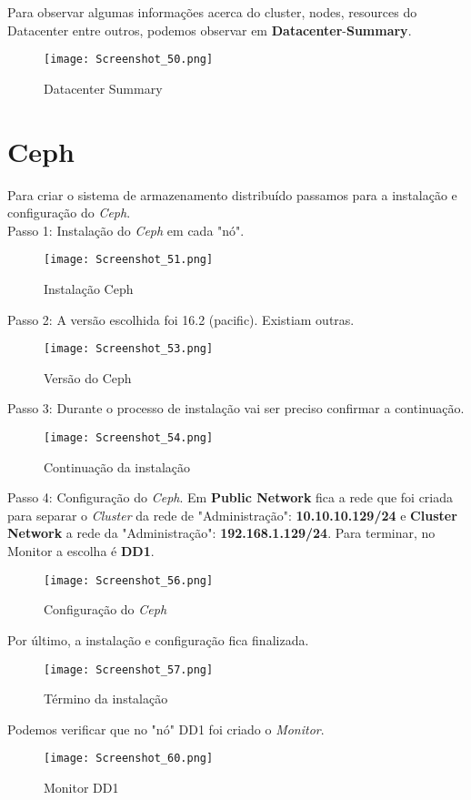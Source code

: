 Para observar algumas informações acerca do cluster, nodes, resources do Datacenter entre outros, podemos observar em \textbf{Datacenter}-\textbf{Summary}.
\begin{figure}[H]
\center
\texttt{[image: Screenshot\_50.png]}
\caption{Datacenter Summary}
\end{figure}


\newpage
\section{Ceph}

Para criar o sistema de armazenamento distribuído passamos para a instalação e configuração do \textit{Ceph}.\\

Passo 1: Instalação do \textit{Ceph} em cada "nó".
\begin{figure}[H]
\center
\texttt{[image: Screenshot\_51.png]}
\caption{Instalação Ceph}
\end{figure}

Passo 2: A versão escolhida foi 16.2 (pacific). Existiam outras.
\begin{figure}[H]
\center
\texttt{[image: Screenshot\_53.png]}
\caption{Versão do Ceph}
\end{figure}

\newpage
Passo 3: Durante o processo de instalação vai ser preciso confirmar a continuação.
\begin{figure}[H]
\center
\texttt{[image: Screenshot\_54.png]}
\caption{Continuação da instalação}
\end{figure}

Passo 4: Configuração do \textit{Ceph}.
Em \textbf{Public Network} fica a rede que foi criada para separar o \textit{Cluster} da rede de "Administração": \textbf{10.10.10.129/24} e \textbf{Cluster Network} a rede da "Administração": \textbf{192.168.1.129/24}.
Para terminar, no Monitor a escolha é \textbf{DD1}.
\begin{figure}[H]
\center
\texttt{[image: Screenshot\_56.png]}
\caption{Configuração do \textit{Ceph}}
\end{figure}

\newpage
Por último, a instalação e configuração fica finalizada.
\begin{figure}[H]
\center
\texttt{[image: Screenshot\_57.png]}
\caption{Término da instalação}
\end{figure}

Podemos verificar que no "nó" DD1 foi criado o \textit{Monitor}.
\begin{figure}[H]
\center
\texttt{[image: Screenshot\_60.png]}
\caption{Monitor DD1}
\end{figure}


